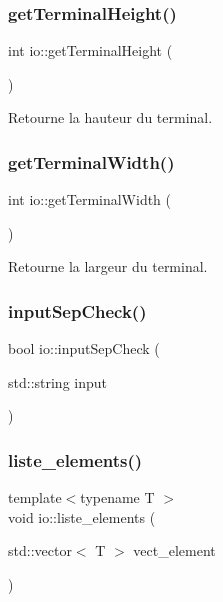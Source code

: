 \subsubsection{\texorpdfstring{get\+Terminal\+Height()}{getTerminalHeight()}}
{\footnotesize\ttfamily int io\+::get\+Terminal\+Height (\begin{DoxyParamCaption}{ }\end{DoxyParamCaption})}



Retourne la hauteur du terminal. 

\mbox{\label{namespaceio_a71636a15a219ee1dcc177e9749cf20bc}} 
\subsubsection{\texorpdfstring{get\+Terminal\+Width()}{getTerminalWidth()}}
{\footnotesize\ttfamily int io\+::get\+Terminal\+Width (\begin{DoxyParamCaption}{ }\end{DoxyParamCaption})}



Retourne la largeur du terminal. 

\mbox{\label{namespaceio_ad825d53d81ddd635e3875dfb9d54f627}} 
\subsubsection{\texorpdfstring{input\+Sep\+Check()}{inputSepCheck()}}
{\footnotesize\ttfamily bool io\+::input\+Sep\+Check (\begin{DoxyParamCaption}\item[{std\+::string}]{input }\end{DoxyParamCaption})}

\mbox{\label{namespaceio_acf5693654c155fd094993bf20ac39343}} 
\subsubsection{\texorpdfstring{liste\+\_\+elements()}{liste\_elements()}}
{\footnotesize\ttfamily template$<$typename T $>$ \\
void io\+::liste\+\_\+elements (\begin{DoxyParamCaption}\item[{std\+::vector$<$ T $>$}]{vect\+\_\+element }\end{DoxyParamCaption})}



